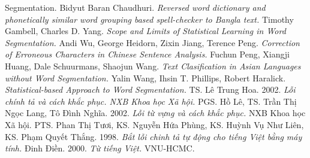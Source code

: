 \documentclass[a4paper,oneside]{book} %
\theoremstyle{break}
\begin{document}
\begin{thebibliography}{}
{  Segmentation.}%
\bibitem{}Bidyut Baran Chaudhuri. {\em Reversed word dictionary and
  phonetically similar word grouping based spell-checker to Bangla
  text.}%
\bibitem{}Timothy Gambell, Charles D. Yang. {\em Scope and Limits of
  Statistical Learning in Word Segmentation.}%
Andi Wu, George Heidorn, Zixin Jiang, Terence
  Peng. {\em Correction of Erroneous Characters in Chinese Sentence
  Analysis.}%
\bibitem{}Fuchun Peng, Xiangji Huang, Dale Schuurmans, Shaojun
  Wang. {\em Text Clasification in Asian Languages without Word
  Segmentation.}%
\bibitem{}Yalin Wang, Ihsin T. Phillips, Robert
  Haralick. {\em Statistical-based Approach to Word Segmentation.}%
TS. Lê Trung Hoa. 2002. {\em Lỗi chính tả và cách khắc phục. NXB Khoa
  học Xã hội.} 
PGS. Hồ Lê, TS. Trần Thị Ngọc Lang, Tô Đình Nghĩa. 2002. {\em Lỗi từ
  vựng và cách khắc phục.} NXB Khoa học Xã hội.
PTS. Phan Thị Tươi, KS. Nguyễn Hứa Phùng, KS. Huỳnh Vụ
  Như Liên, KS. Phạm Quyết Thắng. 1998. {\em Bắt lỗi chinh tả tự động cho
  tiếng Việt bằng máy tính.}
Đinh Điền. 2000. {\em Từ tiếng Việt.} VNU-HCMC.
\end{thebibliography}
\end{document}
